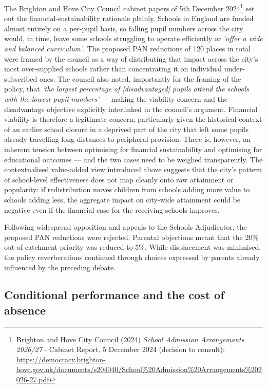 \documentclass[
  12pt,
  titlepage]{article}
\begin{document}
The Brighton and Hove City Council cabinet papers of 5th December
2024\footnote{Brighton and Hove City Council (2024) \emph{School
  Admission Arrangements 2026/27} - Cabinet Report, 5 December 2024
  (decision to consult):
  \url{https://democracy.brighton-hove.gov.uk/documents/s204040/School\%20Admission\%20Arrangements\%202026-27.pdf}}
set out the financial-sustainability rationale plainly. Schools in
England are funded almost entirely on a per-pupil basis, so falling
pupil numbers across the city would, in time, leave some schools
struggling to operate efficiently or \emph{`offer a wide and balanced
curriculum'}. The proposed PAN reductions of 120 places in total were
framed by the council as a way of distributing that impact across the
city's most over-supplied schools rather than concentrating it on
individual under-subscribed ones. The council also noted, importantly
for the framing of the policy, that \emph{`the largest percentage of
{[}disadvantaged{]} pupils attend the schools with the lowest pupil
numbers'} --- making the viability concern and the disadvantage
objective explicitly interlinked in the council's argument. Financial
viability is therefore a legitimate concern, particularly given the
historical context of an earlier school closure in a deprived part of
the city that left some pupils already travelling long distances to
peripheral provision. There is, however, an inherent tension between
optimising for financial sustainability and optimising for educational
outcomes --- and the two cases need to be weighed transparently. The
contextualised value-added view introduced above suggests that the
city's pattern of school-level effectiveness does not map cleanly onto
raw attainment or popularity: if redistribution moves children from
schools adding more value to schools adding less, the aggregate impact
on city-wide attainment could be negative even if the financial case for
the receiving schools improves.

Following widespread opposition and appeals to the Schools Adjudicator,
the proposed PAN reductions were rejected. Parental objections meant
that the 20\% out-of-catchment priority was reduced to 5\%. While
displacement was minimised, the policy reverberations continued through
choices expressed by parents already influenced by the preceding debate.

\subsection{Conditional performance and the cost of
absence}\label{conditional-performance-and-the-cost-of-absence}
\end{document}
